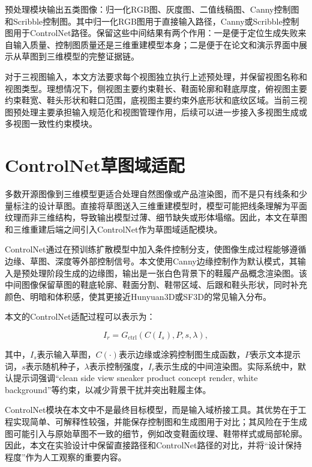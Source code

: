 预处理模块输出五类图像：归一化RGB图、灰度图、二值线稿图、Canny控制图和Scribble控制图。其中归一化RGB图用于直接输入路径，Canny或Scribble控制图用于ControlNet路径。保留这些中间结果有两个作用：一是便于定位生成失败来自输入质量、控制图质量还是三维重建模型本身；二是便于在论文和演示界面中展示从草图到三维模型的完整证据链。

对于三视图输入，本文方法要求每个视图独立执行上述预处理，并保留视图名称和视图类型。理想情况下，侧视图主要约束鞋长、鞋面轮廓和鞋底厚度，俯视图主要约束鞋宽、鞋头形状和鞋口范围，底视图主要约束外底形状和底纹区域。当前三视图预处理主要承担输入规范化和视图管理作用，后续可以进一步接入多视图生成或多视图一致性约束模块。

\section{ControlNet草图域适配}

多数开源图像到三维模型更适合处理自然图像或产品渲染图，而不是只有线条和少量标注的设计草图。直接将草图送入三维重建模型时，模型可能把线条理解为平面纹理而非三维结构，导致输出模型过薄、细节缺失或形体塌缩。因此，本文在草图和三维重建后端之间引入ControlNet作为草图域适配模块。

ControlNet通过在预训练扩散模型中加入条件控制分支，使图像生成过程能够遵循边缘、草图、深度等外部控制信号\citep{zhang2023controlnet}。本文使用Canny边缘控制作为默认模式，其输入是预处理阶段生成的边缘图，输出是一张白色背景下的鞋履产品概念渲染图。该中间图像保留草图的鞋底轮廓、鞋面分割、鞋带区域、后跟和鞋头形状，同时补充颜色、明暗和体积感，使其更接近Hunyuan3D或SF3D的常见输入分布。

本文的ControlNet适配过程可以表示为：

\begin{equation}
  I_r = G_{\mathrm{ctrl}}(C(I_s), P, s, \lambda),
\end{equation}

其中，$I_s$表示输入草图，$C(\cdot)$表示边缘或涂鸦控制图生成函数，$P$表示文本提示词，$s$表示随机种子，$\lambda$表示控制强度，$I_r$表示生成的中间渲染图。实际系统中，默认提示词强调“clean side view sneaker product concept render, white background”等约束，以减少背景干扰并突出鞋履主体。

ControlNet模块在本文中不是最终目标模型，而是输入域桥接工具。其优势在于工程实现简单、可解释性较强，并能保存控制图和生成图用于对比；其风险在于生成图可能引入与原始草图不一致的细节，例如改变鞋面纹理、鞋带样式或局部轮廓。因此，本文在实验设计中保留直接路径和ControlNet路径的对比，并将“设计保持程度”作为人工观察的重要内容。


